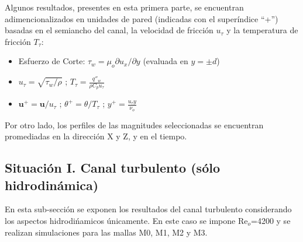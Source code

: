 Algunos resultados, presentes en esta primera parte, se encuentran adimencionalizados en unidades de pared (indicadas con el superíndice ``+'') basadas en el semiancho del canal, la velocidad de fricción $u_{\tau}$ y la temperatura de fricción $T_{\tau}$:

\begin{itemize}
	\item Esfuerzo de Corte: $\tau_w= \mu_o \partial u_x / \partial y$ (evaluada en $y=\pm d$)  
	\item $u_{\tau} = \sqrt{\tau_w / \rho}$ ; $T_{\tau}=\frac{q''_w}{\rho C_p u_{\tau}}$
	\item $\mathbf{u}^+ = \mathbf{u} / u_{\tau}$ ; $\theta^+ = \theta / T_{\tau}$ ; $y^+ = \frac{u_{\tau} y}{\nu_o}$
\end{itemize}
Por otro lado, los perfiles de las magnitudes seleccionadas se encuentran promediadas en la dirección X y Z, y en el tiempo.

\subsection{Situación I. Canal turbulento (sólo hidrodinámica)}

En esta sub-sección se exponen los resultados del canal turbulento considerando los aspectos hidrodińamicos únicamente. En este caso se impone Re$_o$=4200 y se realizan simulaciones para las mallas M0, M1, M2 y M3.  

